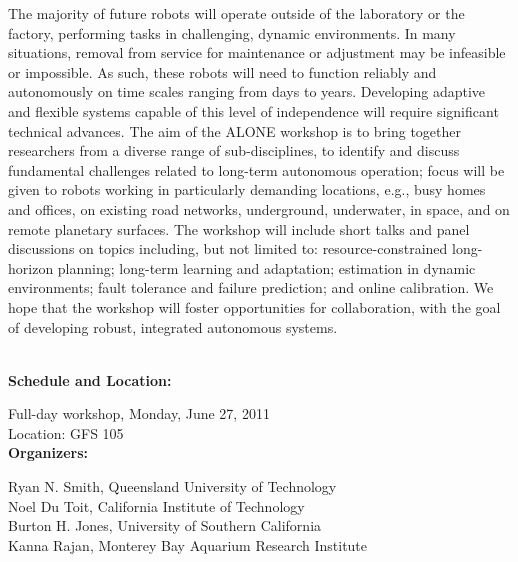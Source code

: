 {The majority of future robots will operate outside of the laboratory or the factory, performing tasks in challenging, dynamic environments. In many situations, removal from service for maintenance or adjustment may be infeasible or impossible. As such, these robots will need to function reliably and autonomously on time scales ranging from days to years. Developing adaptive and flexible systems capable of this level of independence will require significant technical advances. The aim of the ALONE workshop is to bring together researchers from a diverse range of sub-disciplines, to identify and discuss fundamental challenges related to long-term autonomous operation; focus will be given to robots working in particularly demanding locations, e.g., busy homes and offices, on existing road networks, underground, underwater, in space, and on remote planetary surfaces. The workshop will include short talks and panel discussions on topics including, but not limited to: resource-constrained long-horizon planning; long-term learning and adaptation; estimation in dynamic environments; fault tolerance and failure prediction; and online calibration. We hope that the workshop will foster opportunities for collaboration, with the goal of developing robust, integrated autonomous systems.



\\[5mm]

{\bf  Schedule and Location:}

Full-day workshop, Monday, June 27, 2011\\
Location: GFS 105 \\[4mm]

{\bf  Organizers:}

Ryan N. Smith, Queensland University of Technology\\
Noel Du Toit, California Institute of Technology\\
Burton H. Jones, University of Southern California\\
Kanna Rajan, Monterey Bay Aquarium Research Institute\\[4mm]


}
